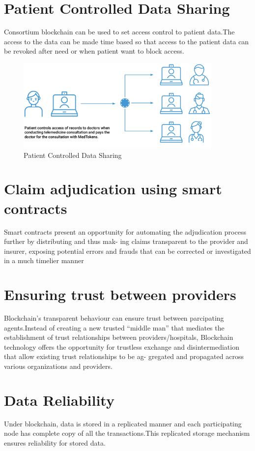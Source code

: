\documentclass[12pt]{report}
\begin{document}
\section{Patient Controlled Data Sharing}
Consortium blockchain can be used to set access control to patient data.The access to the data can be made time based so that access to the patient data can be revoked after need or when patient want to block access.
\begin{figure}[H]
\centering
\includegraphics[width=0.9\textwidth]{sharing.png}
\caption{Patient Controlled Data Sharing}
\label{sharing}
\end{figure}
\section{Claim adjudication using smart contracts}
Smart contracts present
an opportunity for automating the adjudication process further by distributing and thus mak-
ing claims transparent to the provider and insurer, exposing potential errors and frauds that
can be corrected or investigated in a much timelier manner

\section{Ensuring trust between providers}
Blockchain's transparent behaviour can ensure trust between parcipating agents.Instead of creating a new trusted “middle man” that mediates the establishment of
trust relationships between providers/hospitals, Blockchain technology offers the opportunity
for trustless exchange and disintermediation that allow existing trust relationships to be ag-
gregated and propagated across various organizations and providers.

\section{Data Reliability}
Under blockchain, data is stored in a replicated manner and each participating node has complete copy of all the transactions.This replicated storage mechanism ensures reliability for stored data.
\end{document}
